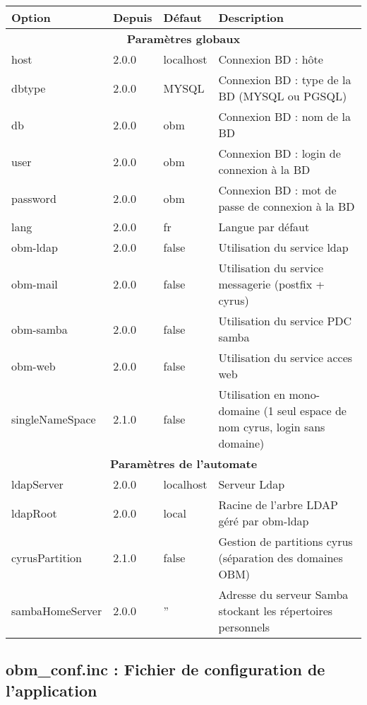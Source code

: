 \begin{longtable}{|p{3cm}|p{1cm}|p{2.5cm}|p{8cm}|}
\hline
\textbf{Option} & \textbf{Depuis} & \textbf{Défaut} & \textbf{Description} \\
\hline
\hline
\multicolumn{4}{c}{\textbf{Paramètres globaux}}\\
\hline
\hline
host & 2.0.0 & localhost & Connexion BD : hôte \\ 
\hline
dbtype & 2.0.0 & MYSQL & Connexion BD : type de la BD (MYSQL ou PGSQL) \\ 
\hline
db & 2.0.0 & obm & Connexion BD : nom de la BD \\ 
\hline
user & 2.0.0 & obm & Connexion BD : login de connexion à la BD \\ 
\hline
password & 2.0.0 & obm & Connexion BD : mot de passe de connexion à la BD \\ 
\hline
lang & 2.0.0 & fr & Langue par défaut \\ 
\hline
obm-ldap & 2.0.0 & false & Utilisation du service ldap \\ 
\hline
obm-mail & 2.0.0 & false & Utilisation du service messagerie (postfix + cyrus) \\ 
\hline
obm-samba & 2.0.0 & false & Utilisation du service PDC samba \\ 
\hline
obm-web & 2.0.0 & false & Utilisation du service acces web \\ 
\hline
singleNameSpace & 2.1.0 & false & Utilisation en mono-domaine (1 seul espace de nom cyrus, login sans domaine) \\ 

\hline
\hline
\multicolumn{4}{c}{\textbf{Paramètres de l'automate}}\\
\hline
\hline
ldapServer & 2.0.0 & localhost & Serveur Ldap \\ 
\hline
ldapRoot & 2.0.0 & local & Racine de l'arbre LDAP géré par obm-ldap \\ 
\hline
cyrusPartition & 2.1.0 & false & Gestion de partitions cyrus (séparation des domaines OBM) \\ 
\hline
sambaHomeServer & 2.0.0 & '' & Adresse du serveur Samba stockant les répertoires personnels \\ 
\hline
\end{longtable}


\subsection{obm\_conf.inc : Fichier de configuration de l'application}

